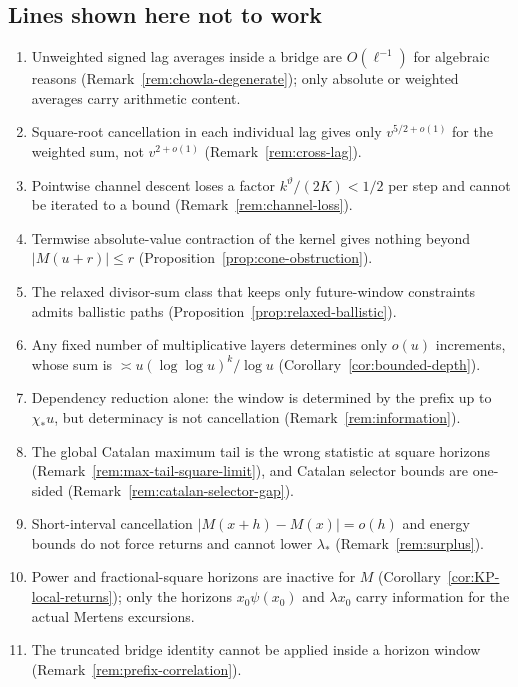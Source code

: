 \documentclass[11pt,reqno]{amsart}
\numberwithin{equation}{section}
\theoremstyle{plain}
\theoremstyle{definition}
\theoremstyle{remark}
\begin{document}
\subsection*{Lines shown here not to work}
\begin{enumerate}[label=\textup{(\arabic*)}]
\item Unweighted signed lag averages inside a bridge are $O(\ell^{-1})$ for
algebraic reasons (Remark~\ref{rem:chowla-degenerate}); only absolute or
weighted averages carry arithmetic content.
\item Square-root cancellation in each individual lag gives only
$v^{5/2+o(1)}$ for the weighted sum, not $v^{2+o(1)}$
(Remark~\ref{rem:cross-lag}).
\item Pointwise channel descent loses a factor $k^\vartheta/(2K)<1/2$ per
step and cannot be iterated to a bound (Remark~\ref{rem:channel-loss}).
\item Termwise absolute-value contraction of the kernel gives nothing beyond
$|M(u+r)|\le r$ (Proposition~\ref{prop:cone-obstruction}).
\item The relaxed divisor-sum class that keeps only future-window
constraints admits ballistic paths (Proposition~\ref{prop:relaxed-ballistic}).
\item Any fixed number of multiplicative layers determines only $o(u)$
increments, whose sum is $\asymp u(\log\log u)^k/\log u$
(Corollary~\ref{cor:bounded-depth}).
\item Dependency reduction alone: the window is determined by the prefix up
to $\chi_*u$, but determinacy is not cancellation
(Remark~\ref{rem:information}).
\item The global Catalan maximum tail is the wrong statistic at square
horizons (Remark~\ref{rem:max-tail-square-limit}), and Catalan selector
bounds are one-sided (Remark~\ref{rem:catalan-selector-gap}).
\item Short-interval cancellation $|M(x+h)-M(x)|=o(h)$ and energy bounds do
not force returns and cannot lower $\lambda_*$ (Remark~\ref{rem:surplus}).
\item Power and fractional-square horizons are inactive for $M$
(Corollary~\ref{cor:KP-local-returns}); only the horizons $x_0\psi(x_0)$
and $\lambda x_0$ carry information for the actual Mertens excursions.
\item The truncated bridge identity cannot be applied inside a horizon
window (Remark~\ref{rem:prefix-correlation}).
\end{enumerate}
\end{document}
